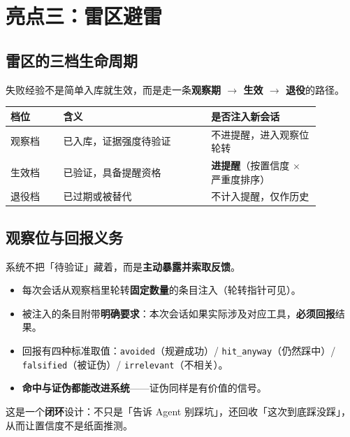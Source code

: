 \documentclass[11pt,a4paper]{ctexart}
\begin{document}
\section{亮点三：雷区避雷}

\subsection{雷区的三档生命周期}

失败经验不是简单入库就生效，而是走一条\textbf{观察期 $\rightarrow$ 生效 $\rightarrow$ 退役}的路径。

\begin{center}
\begin{tabular}{@{}p{0.15\linewidth}p{0.42\linewidth}p{0.31\linewidth}@{}}
\toprule
\textbf{档位} & \textbf{含义} & \textbf{是否注入新会话} \\
\midrule
观察档 & 已入库，证据强度待验证 & 不进提醒，进入观察位轮转 \\
生效档 & 已验证，具备提醒资格 & \textbf{进提醒}（按置信度 $\times$ 严重度排序） \\
退役档 & 已过期或被替代 & 不计入提醒，仅作历史 \\
\bottomrule
\end{tabular}
\end{center}

\subsection{观察位与回报义务}

系统不把「待验证」藏着，而是\textbf{主动暴露并索取反馈}。

\begin{itemize}
  \item 每次会话从观察档里轮转\textbf{固定数量}的条目注入（轮转指针可见）。
  \item 被注入的条目附带\textbf{明确要求}：本次会话如果实际涉及对应工具，\textbf{必须回报}结果。
  \item 回报有四种标准取值：\texttt{avoided}（规避成功）/ \texttt{hit\_anyway}（仍然踩中）/ \texttt{falsified}（被证伪）/ \texttt{irrelevant}（不相关）。
  \item \textbf{命中与证伪都能改进系统}——证伪同样是有价值的信号。
\end{itemize}

这是一个\textbf{闭环}设计：不只是「告诉 Agent 别踩坑」，还回收「这次到底踩没踩」，从而让置信度不是纸面推测。

\end{document}
